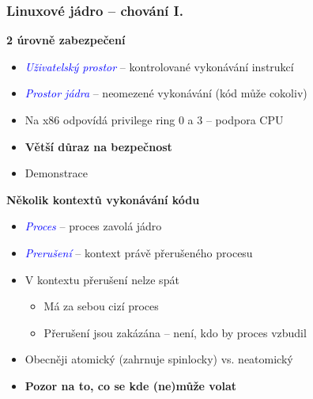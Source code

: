 \documentclass[xcolor=dvipsnames]{beamer}
\let\Oldemph\emph
\renewcommand{\emph}[1]{\textcolor{blue}{\Oldemph{#1}}}
\newcommand{\heading}[1]{\textbf{\textcolor{BurntOrange}{#1}}}
\begin{document}
\begin{frame}
  \frametitle{Linuxové jádro -- chování I.}

  \heading{2 úrovně zabezpečení}
  \begin{itemize}
  \item \emph{Uživatelský prostor} -- kontrolované vykonávání instrukcí
  \item \emph{Prostor jádra} -- neomezené vykonávání (kód může cokoliv)
  \item Na x86 odpovídá privilege ring 0 a 3 -- podpora CPU
  \item \textbf{Větší důraz na bezpečnost}
  \item Demonstrace
  \end{itemize}

  \pause
  \medskip

  \heading{Několik kontextů vykonávání kódu}
  \begin{itemize}
  \item \emph{Proces} -- proces zavolá jádro
  \item \emph{Prerušení} -- kontext právě přerušeného procesu
  \item V kontextu přerušení nelze spát
  \begin{itemize}
  \item Má za sebou cizí proces
  \item Přerušení jsou zakázána -- není, kdo by proces vzbudil
  \end{itemize}
  \item Obecněji atomický (zahrnuje spinlocky) vs. neatomický
  \item \textbf{Pozor na to, co se kde (ne)může volat}
  \end{itemize}

\end{frame}
\end{document}
